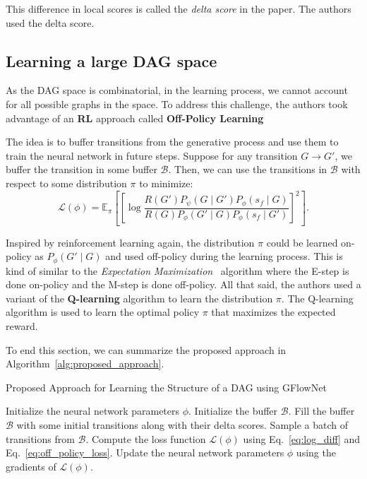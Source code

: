 \documentclass{lxaiproposal}
\begin{document}
    This difference in local scores is called the \textit{delta score} in the paper. The authors used the delta score.

    \subsection{Learning a large DAG space}
    \vspace*{-3mm}

    As the DAG space is combinatorial, in the learning process, we cannot account for all possible graphs in the
    space. To address this challenge, the authors took advantage of an \textbf{RL} approach called \textbf{
        Off-Policy Learning}

    The idea is to buffer transitions from the generative process and use them to train the neural network in future
    steps. Suppose for any transition $G \to G'$, we buffer the transition in some buffer $\mathcal{B}$.
    Then, we can use the transitions in $\mathcal{B}$ with respect to some distribution $\pi$ to minimize:
    \begin{equation}
        \mathcal{L}(\phi) = \mathbb{E}_{\pi} \left[ \left[ \log
        \frac{R(G')P_{\psi}(G \mid G')P_{\phi}(s_f \mid G)}{R(G)P_{\phi}(G' \mid G)P_{\phi}(s_f \mid G')} \right]^2 \right].
        \label{eq:off_policy_loss}
    \end{equation}

    Inspired by reinforcement learning again, the distribution $\pi$ could be learned on-policy as
    $P_{\phi}(G' \mid G)$ and used off-policy during the learning process. This is kind of similar to the \textit{
        Expectation Maximization}~\cite{dempster1977maximumlikelihood} algorithm where the E-step is done on-policy and
    the M-step is done off-policy.
    All that said, the authors used a variant of the \textbf{Q-learning} algorithm to learn the distribution $\pi$.
    The Q-learning algorithm is used to learn the optimal policy $\pi$ that maximizes the expected reward.

    To end this section, we can summarize the proposed approach in Algorithm~\ref{alg:proposed_approach}.
    \begin{algorithm}
        \caption{Proposed Approach for Learning the Structure of a DAG using GFlowNet}
        \label{alg:proposed_approach}
        \begin{algorithmic}[1]
            \State Initialize the neural network parameters $\phi$.
            \State Initialize the buffer $\mathcal{B}$.
            \State Fill the buffer $\mathcal{B}$ with some initial transitions along with their delta scores.
                \State Sample a batch of transitions from $\mathcal{B}$.
                \State Compute the loss function $\mathcal{L}(\phi)$ using Eq.~\eqref{eq:log_diff} and Eq.~\eqref{eq:off_policy_loss}.
                \State Update the neural network parameters $\phi$ using the gradients of $\mathcal{L}(\phi)$.
            \EndWhile
        \end{algorithmic}
    \end{algorithm}
\end{document}
